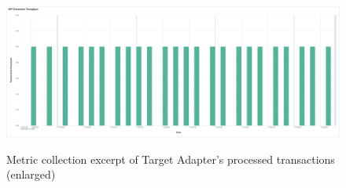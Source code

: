 \centering
\begin{figure}[htbp]
    \centering
     {
        \includegraphics[width=1.8\textwidth]{chapters/images/art-performance/art-transaction-throughput-minute.png}
    }
    \caption{Metric collection excerpt of Target Adapter's processed transactions (enlarged)}
    \label{fig:appendix02:results:arttransactionminute}
\end{figure}
